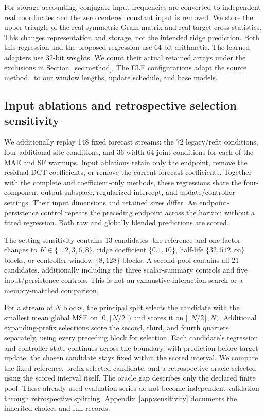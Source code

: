 For storage accounting, conjugate input frequencies are converted to independent real coordinates and the zero centered constant input is removed. We store the upper triangle of the real symmetric Gram matrix and real target cross-statistics. This changes representation and storage, not the intended ridge prediction. Both this regression and the proposed regression use 64-bit arithmetic. The learned adapters use 32-bit weights. We count their actual retained arrays under the exclusions in Section~\ref{sec:method}. The ELF configurations adapt the source method~\cite{elf2025} to our window lengths, update schedule, and base models.

\subsection{Input ablations and retrospective selection sensitivity}
We additionally replay 148 fixed forecast streams: the 72 legacy/refit conditions, four additional-site conditions, and 36 width-64 joint conditions for each of the MAE and SF warmups. Input ablations retain only the endpoint, remove the residual DCT coefficients, or remove the current forecast coefficients. Together with the complete and coefficient-only methods, these regressions share the four-component output subspace, regularized intercept, and update/controller settings. Their input dimensions and retained sizes differ. An endpoint-persistence control repeats the preceding endpoint across the horizon without a fitted regression. Both raw and globally blended predictions are scored.

The setting sensitivity contains 13 candidates: the reference and one-factor changes to $K\in\{1,2,3,6,8\}$, ridge coefficient $\{0.1,10\}$, half-life $\{32,512,\infty\}$ blocks, or controller window $\{8,128\}$ blocks. A second pool contains all 21 candidates, additionally including the three scalar-summary controls and five input/persistence controls. This is not an exhaustive interaction search or a memory-matched comparison.

For a stream of $N$ blocks, the principal split selects the candidate with the smallest mean global MSE on $[0,\lfloor N/2\rfloor)$ and scores it on $[\lfloor N/2\rfloor,N)$. Additional expanding-prefix selections score the second, third, and fourth quarters separately, using every preceding block for selection. Each candidate's regression and controller state continues across the boundary, with prediction before target update; the chosen candidate stays fixed within the scored interval. We compare the fixed reference, prefix-selected candidate, and a retrospective oracle selected using the scored interval itself. The oracle gap describes only the declared finite pool. These already-used evaluation series do not become independent validation through retrospective splitting. Appendix~\ref{app:sensitivity} documents the inherited choices and full records.

